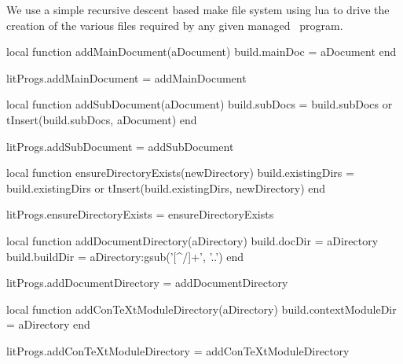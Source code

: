 
\startchapter[title=Lua Make System Files]

We use a simple recursive descent based make file system using lua to 
drive the creation of the various files required by any given 
 managed \ConTeXt\ program. 

\startMkIVCode
\def\addMainDocument#1{
  \directlua{
    thirddata.literateProgs.addMainDocument('#1')
  }
}

\def\addSubDocument#1{
  \directlua{
    thirddata.literateProgs.addSubDocument('#1')
  }
}

\def\ensureDirectoryExists#1{
  \directlua{
    thirddata.literateProgs.ensureDirectoryExists('#1')
  }
}

\def\addDocumentDirectory#1{
  \directlua{
    thirddata.literateProgs.addDocumentDirectory('#1')
  }
}

\def\addConTeXtModuleDirectory#1{
  \directlua{
    thirddata.literateProgs.addConTeXtModuleDirectory('#1')
  }
}
\stopMkIVCode

\startLuaCode
local function addMainDocument(aDocument)
  build.mainDoc = aDocument
end

litProgs.addMainDocument = addMainDocument

local function addSubDocument(aDocument)
  build.subDocs = build.subDocs or { }
  tInsert(build.subDocs, aDocument)
end

litProgs.addSubDocument = addSubDocument

local function ensureDirectoryExists(newDirectory)
  build.existingDirs = build.existingDirs or { }
  tInsert(build.existingDirs, newDirectory)
end

litProgs.ensureDirectoryExists = ensureDirectoryExists

local function addDocumentDirectory(aDirectory)
  build.docDir   = aDirectory
  build.buildDir = aDirectory:gsub('[^/]+', '..')
end

litProgs.addDocumentDirectory = addDocumentDirectory

local function addConTeXtModuleDirectory(aDirectory)
  build.contextModuleDir = aDirectory
end

litProgs.addConTeXtModuleDirectory = addConTeXtModuleDirectory
\stopLuaCode

\startMkIVCode
\def\compileLmsfile#1{
  \directlua{
    thirddata.literateProgs.compileLmsfile('#1')
  }
}
\stopMkIVCode

